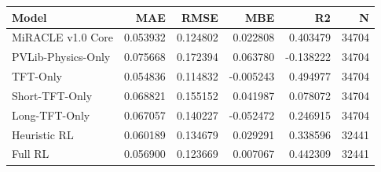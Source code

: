 \begin{tabular}{lrrrrr}
\toprule
Model & MAE & RMSE & MBE & R2 & N \\
\midrule
MiRACLE v1.0 Core & 0.053932 & 0.124802 & 0.022808 & 0.403479 & 34704 \\
PVLib-Physics-Only & 0.075668 & 0.172394 & 0.063780 & -0.138222 & 34704 \\
TFT-Only & 0.054836 & 0.114832 & -0.005243 & 0.494977 & 34704 \\
Short-TFT-Only & 0.068821 & 0.155152 & 0.041987 & 0.078072 & 34704 \\
Long-TFT-Only & 0.067057 & 0.140227 & -0.052472 & 0.246915 & 34704 \\
Heuristic RL & 0.060189 & 0.134679 & 0.029291 & 0.338596 & 32441 \\
Full RL & 0.056900 & 0.123669 & 0.007067 & 0.442309 & 32441 \\
\bottomrule
\end{tabular}
